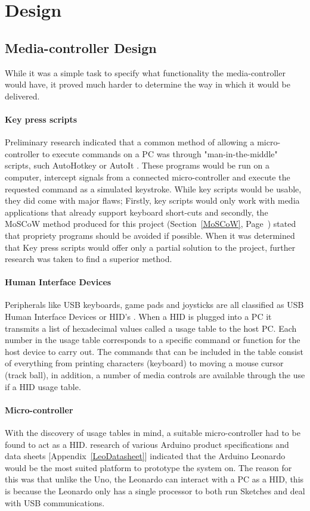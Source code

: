 \documentclass{article}
\begin{document}
	\section{Design}
		\subsection{Media-controller Design}
			While it was a simple task to specify what functionality the media-controller would have, it proved much harder to determine the way in which it would be delivered. 
			
			\paragraph{Key press scripts}
			Preliminary research indicated that a common method of allowing a micro-controller to execute commands on a PC was through "man-in-the-middle" scripts, such AutoHotkey \cite{AutoHotkey:online} or AutoIt \cite{AutoIt:online}. These programs would be run on a computer, intercept signals from a connected micro-controller and execute the requested command as a simulated keystroke.
			While key scripts would be usable, they did come with major flaws; Firstly, key scripts would only work with media applications that already support keyboard short-cuts and secondly, the MoSCoW method produced for this project (Section~\ref{MoSCoW}, Page~\pageref{MoSCoW}) stated that propriety programs should be avoided if possible.
			When it was determined that Key press scripts would offer only a partial solution to the project, further research was taken to find a superior method.
			
			\paragraph{Human Interface Devices}
			Peripherals like USB keyboards, game pads and joysticks are all classified as USB Human Interface Devices or HID's \cite{HID:online} \cite{HIDSiliconLab:online}. When a HID is plugged into a PC it transmits a list of hexadecimal values called a usage table to the host PC. Each number in the usage table corresponds to a specific command or function for the host device to carry out. The commands that can be included in the table consist of everything from printing characters (keyboard) to moving a mouse cursor (track ball), in addition, a number of media controls are available through the use if a HID usage table. 
							
			\paragraph{Micro-controller}
			With the discovery of usage tables in mind, a suitable micro-controller had to be found to act as a HID. research of various Arduino product specifications \cite{Uno:online} \cite{Leonardo:online} \cite{LeonardoGuide:online} and data sheets [Appendix~\ref{LeoDatasheet}] indicated that the Arduino Leonardo would be the most suited platform to prototype the system on. The reason for this was that unlike the Uno, the Leonardo can interact with a PC as a HID, this is because the Leonardo only has a single processor to both run Sketches and deal with USB communications.
			
\end{document}
